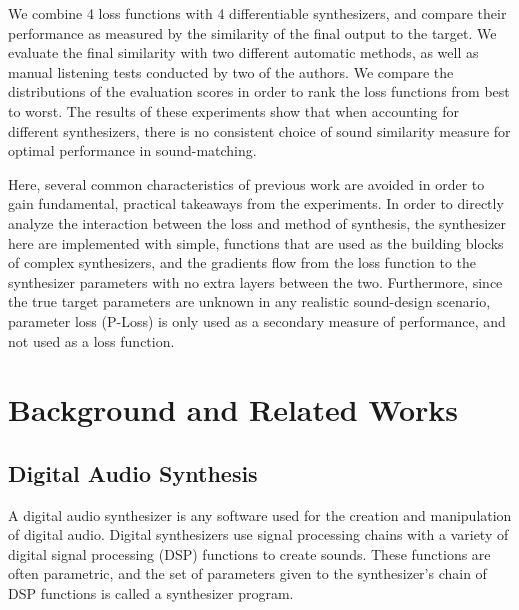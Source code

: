 \documentclass[lettersize,journal]{IEEEtran}
\providecommand{\gls}[1]{#1}
\begin{document}


We combine 4 loss functions with 4 differentiable synthesizers, and compare their performance as measured by the similarity of the final output to the target. We evaluate the final similarity with two different automatic methods, as well as manual listening tests conducted by two of the authors. We compare the distributions of the evaluation scores in order to rank the loss functions from best to worst. The results of these experiments show that when accounting for different synthesizers, there is no consistent choice of sound similarity measure for optimal performance in sound-matching.

Here, several common characteristics of previous work are avoided in order to gain fundamental, practical takeaways from the experiments. In order to directly analyze the interaction between the loss and method of synthesis, the synthesizer here are implemented with simple, functions that are used as the building blocks of complex synthesizers, and the gradients flow from the loss function to the synthesizer parameters with no extra layers between the two. Furthermore, since the true target parameters are unknown in any realistic sound-design scenario, parameter loss (P-Loss) is only used as a secondary measure of performance, and not used as a loss function.



\section{Background and Related Works}
\subsection{Digital Audio Synthesis}
\label{sec:dsp}
A digital audio synthesizer is any software used for the creation and manipulation of digital audio. Digital synthesizers use signal processing chains with a variety of digital signal processing (\gls{DSP}) functions to create sounds. These functions are often parametric, and the set of parameters given to the synthesizer's chain of DSP functions is called a synthesizer program.
\end{document}
